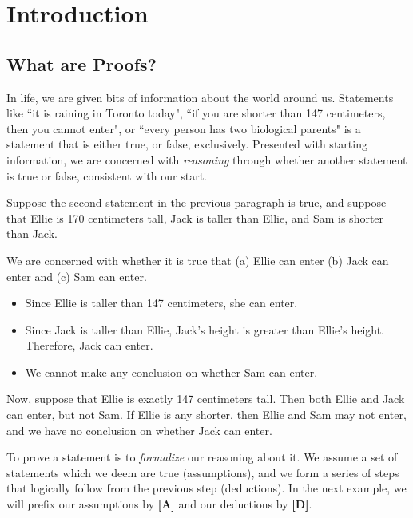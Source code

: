 \documentclass[../proofs.tex]{subfiles}
\newcommand{\assump}{\textbf{[A]}}
\newcommand{\deduct}{\textbf{[D]}}
\begin{document}
\chapter{Introduction}
\section{What are Proofs?}
In life, we are given bits of information about the world around us.
Statements like ``it is raining in Toronto today", ``if you are shorter than 147
centimeters, then you cannot enter", or ``every person has two biological
parents" is a statement that is either true, or false, exclusively. Presented
with starting information, we are concerned with \emph{reasoning} through
whether another statement is true or false, consistent with our start.

\begin{expl}{}
  Suppose the second statement in the previous paragraph is true, and
  suppose that Ellie is 170 centimeters tall, Jack is taller than Ellie, and Sam
  is shorter than Jack.

  We are concerned with whether it is true that (a) Ellie can enter (b) Jack
  can enter and (c) Sam can enter.

  \begin{itemize}
    \item Since Ellie is taller than 147 centimeters, she can enter.
    \item Since Jack is taller than Ellie, Jack's height is greater than
          Ellie's height. Therefore, Jack can enter.
    \item We cannot make any conclusion on whether Sam can enter.
  \end{itemize}

  Now, suppose that Ellie is exactly 147 centimeters tall. Then both Ellie and
  Jack can enter, but not Sam. If Ellie is any shorter, then Ellie and Sam may
  not enter, and we have no conclusion on whether Jack can enter.
\end{expl}
To prove a statement is to \emph{formalize} our reasoning about it. We assume a
set of statements which we deem are true (assumptions), and we form a series of
steps that logically follow from the previous step (deductions). In the next
example, we will prefix our assumptions by \assump{} and our deductions by
\deduct.
\end{document}

